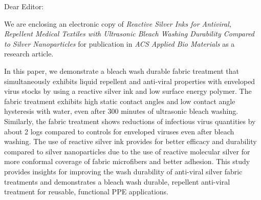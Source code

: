 \documentclass[11pt]{letter}
\date{\today}
\begin{document}
\begin{letter}{}


\opening{Dear Editor:}
 We are enclosing an electronic copy of \textit{Reactive Silver Inks for Antiviral, Repellent Medical Textiles with Ultrasonic Bleach Washing Durability Compared to Silver Nanoparticles}
for publication in %
\textit{ACS Applied Bio Materials} as a research article.


In this paper, we demonstrate a bleach wash durable 
fabric treatment that simultaneously exhibits liquid repellent and anti-viral properties with enveloped virus stocks by using a reactive silver ink and low surface energy polymer. %
The fabric treatment 
exhibits high static contact angles and low contact angle hysteresis with water, even after 300 minutes of ultrasonic bleach washing. Similarly, the fabric treatment shows reductions of infectious virus quantities by about 2 logs compared to controls for enveloped viruses even after bleach washing. The use of reactive silver ink provides for 
better efficacy and durability compared to silver nanoparticles due to the use of reactive molecular silver for more conformal coverage of fabric microfibers and better adhesion.  This study provides insights for improving the wash durability of anti-viral silver fabric treatments and demonstrates a bleach wash durable, repellent anti-viral treatment for reusable, functional PPE applications. 


\end{letter}
\end{document}
